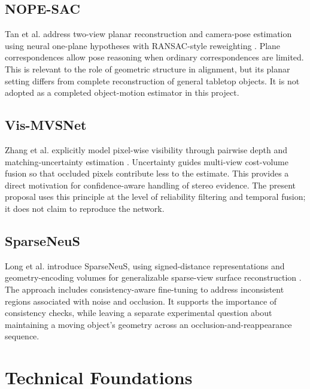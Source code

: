\subsection{NOPE-SAC}
Tan et al. address two-view planar reconstruction and camera-pose estimation using neural one-plane hypotheses with RANSAC-style reweighting \cite{nope}. Plane correspondences allow pose reasoning when ordinary correspondences are limited. This is relevant to the role of geometric structure in alignment, but its planar setting differs from complete reconstruction of general tabletop objects. It is not adopted as a completed object-motion estimator in this project.

\subsection{Vis-MVSNet}
Zhang et al. explicitly model pixel-wise visibility through pairwise depth and matching-uncertainty estimation \cite{vis}. Uncertainty guides multi-view cost-volume fusion so that occluded pixels contribute less to the estimate. This provides a direct motivation for confidence-aware handling of stereo evidence. The present proposal uses this principle at the level of reliability filtering and temporal fusion; it does not claim to reproduce the network.

\subsection{SparseNeuS}
Long et al. introduce SparseNeuS, using signed-distance representations and geometry-encoding volumes for generalizable sparse-view surface reconstruction \cite{sparseneus}. The approach includes consistency-aware fine-tuning to address inconsistent regions associated with noise and occlusion. It supports the importance of consistency checks, while leaving a separate experimental question about maintaining a moving object's geometry across an occlusion-and-reappearance sequence.

\section{Technical Foundations}
